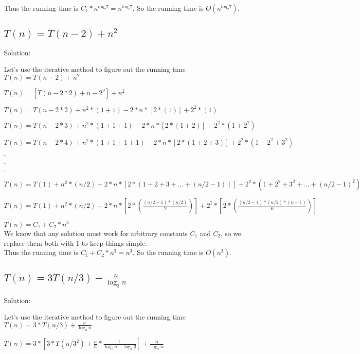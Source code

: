 \documentclass[18 pt]{article}
\begin{document}
Thus the running time is $C_1*n^{log_2{7}}= n^{log_2{7}}$. So the running time is $O(n^{log_2{7}})$.


\begin{flushleft}
\section{$T(n) = T(n-2) + n^2$}
\Large Solution:
\end{flushleft}

Let's use the iterative method to figure out the running time \\

$T(n) = T(n-2) + n^2$

$T(n) = [T(n-2*2)+{n-2}^2] + n^2 $

$T(n) = T(n-2*2)+ n^2*(1+1)-2*n*[2*(1)]+2^2*(1) $

$T(n) = T(n-2*3)+ n^2*(1+1+1)-2*n*[2*(1+2)]+2^2*(1+2^2) $

$T(n) = T(n-2*4)+ n^2*(1+1+1+1)-2*n*[2*(1+2+3)]+2^2*(1+2^2+3^2) $

$.$

$.$

$.$

$T(n) = T(1)+ n^2*(n/2)-2*n*[2*(1+2+3+...+(n/2-1))]+2^2*(1+2^2+3^2+...+(n/2-1)^2) $

$T(n) = T(1)+ n^2*(n/2)-2*n*\left[2*\left(\frac{(n/2-1)*(n/2)}{2}\right)\right]+2^2*\left[2*\left(\frac{(n/2-1)*(n/2)*(n-1)}{6}\right)\right] $

$T(n) = C_1 + C_2*n^3$\\

We know that any solution must work for arbitrary constants $C_1$ and $C_2$, so we replace them both with 1 to keep things simple. \\

Thus the running time is $C_1 + C_2*n^3 = n^3$. So the running time is $O(n^3)$.


\begin{flushleft}
\section{$T(n) = 3T(n/3) + \frac{n}{\log_3{n}}$}
\Large Solution:
\end{flushleft}

Let's use the iterative method to figure out the running time \\

$T(n) = 3*T(n/3) + \frac{n}{\log_3{n}}$

$T(n) = 3*\left[3*T(n/{3^2}) + \frac{n}{3}*{\frac{1}{\log_3{n}-\log_3{3}}}\right] + \frac{n}{\log_3{n}} $
\end{document}
